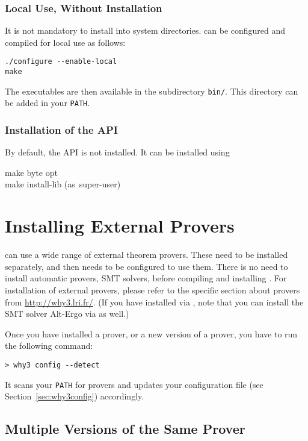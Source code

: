 \subsubsection{Local Use, Without Installation}

It is not mandatory to install \why into system directories.
\why can be configured and compiled for local use as follows:
\begin{verbatim}
./configure --enable-local
make
\end{verbatim}
The \why executables are then available in the subdirectory
\texttt{bin/}. This directory can be added in your \texttt{PATH}.

\subsubsection{Installation of the \why API}
\label{sec:installlib}

By default, the \why API is not installed. It can be installed using
\begin{flushleft}\ttfamily
make byte opt \\
make install-lib \mbox{\rmfamily (as super-user)}
\end{flushleft}

\section{Installing External Provers}
\label{provers}

\why can use a wide range of external theorem provers. These need to
be installed separately, and then \why needs to be configured to use
them. There is no need to install automatic provers, \eg SMT solvers,
before compiling and installing \why.
For installation of external provers, please refer to the specific
section about provers from \url{http://why3.lri.fr/}.
(If you have installed \why via \opam, note that you can install the
SMT solver Alt-Ergo via \opam as well.)

Once you have installed a prover, or a new version of a prover, you
have to run the following command:
\begin{verbatim}
> why3 config --detect
\end{verbatim}
It scans your \texttt{PATH} for provers and updates your configuration
file (see Section~\ref{sec:why3config}) accordingly.

\subsection{Multiple Versions of the Same Prover}

